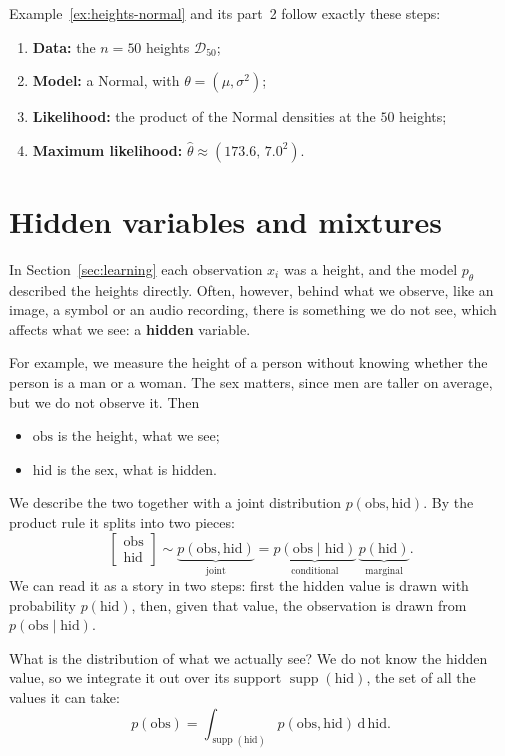 \documentclass[a4paper,12pt,oneside]{report}
\begin{document}
Example~\ref{ex:heights-normal} and its part~2 follow
exactly these steps:
\begin{enumerate}
\item \textbf{Data:} the $n=50$ heights $\mathcal{D}_{50}$;
\item \textbf{Model:} a Normal, with $\theta=(\mu,\sigma^2)$;
\item \textbf{Likelihood:} the product of the Normal densities at the $50$
heights;
\item \textbf{Maximum likelihood:} $\hat\theta\approx(173.6,\,7.0^2)$.
\end{enumerate}

\section{Hidden variables and mixtures}\label{sec:hidden}

In Section~\ref{sec:learning} each observation $x_i$ was a height, and the
model $p_\theta$ described the heights directly. Often, however, behind what
we observe, like an image, a symbol or an audio recording, there is something
we do not see, which affects what we see: a \textbf{hidden} variable.

For example, we measure the height of a person without knowing whether the
person is a man or a woman. The sex matters, since men are taller on
average, but we do not observe it. Then
\begin{itemize}
\item $\text{obs}$ is the height, what we see;
\item $\text{hid}$ is the sex, what is hidden.
\end{itemize}

\label{marginal}We describe the two together with a joint distribution
$p(\text{obs},\text{hid})$. By the product rule it splits into two pieces:
\[
\begin{bmatrix}\text{obs}\\ \text{hid}\end{bmatrix}\sim
\underbrace{p(\text{obs},\text{hid})}_{\text{joint}}
=\underbrace{p(\text{obs}\mid\text{hid})}_{\text{conditional}}\,
\underbrace{p(\text{hid})}_{\text{marginal}}.
\]
We can read it as a story in two steps: first the hidden value is drawn with
probability $p(\text{hid})$, then, given that value, the observation is
drawn from $p(\text{obs}\mid\text{hid})$.

What is the distribution of what we actually see? We do not know the hidden
value, so we integrate it out over its support $\operatorname{supp}(\text{hid})$, the
set of all the values it can take:
\[
p(\text{obs})=\int_{\operatorname{supp}(\text{hid})} p(\text{obs},\text{hid})\,\mathrm{d}\,\text{hid}.
\]
\end{document}
